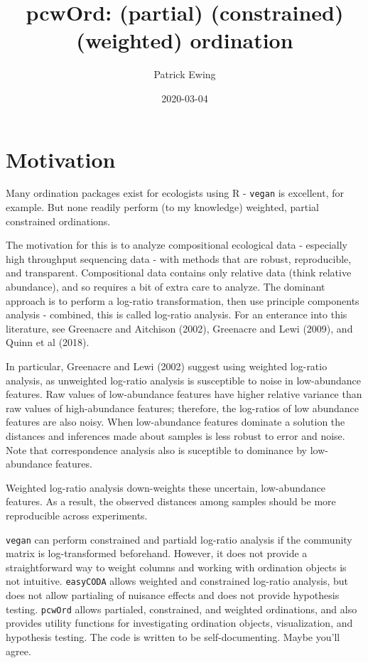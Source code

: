 \documentclass[
]{article}
\title{pcwOrd: (partial) (constrained) (weighted) ordination}
\author{Patrick Ewing}
\date{2020-03-04}
\begin{document}
\maketitle

\tableofcontents
\newpage

\hypertarget{motivation}{%
\section{Motivation}\label{motivation}}

Many ordination packages exist for ecologists using R - \texttt{vegan}
is excellent, for example. But none readily perform (to my knowledge)
weighted, partial constrained ordinations.

The motivation for this is to analyze compositional ecological data -
especially high throughput sequencing data - with methods that are
robust, reproducible, and transparent. Compositional data contains only
relative data (think relative abundance), and so requires a bit of extra
care to analyze. The dominant approach is to perform a log-ratio
transformation, then use principle components analysis - combined, this
is called log-ratio analysis. For an enterance into this literature, see
Greenacre and Aitchison (2002), Greenacre and Lewi (2009), and Quinn et
al (2018).

In particular, Greenacre and Lewi (2002) suggest using weighted
log-ratio analysis, as unweighted log-ratio analysis is susceptible to
noise in low-abundance features. Raw values of low-abundance features
have higher relative variance than raw values of high-abundance
features; therefore, the log-ratios of low abundance features are also
noisy. When low-abundance features dominate a solution the distances and
inferences made about samples is less robust to error and noise. Note
that correspondence analysis also is suceptible to dominance by
low-abundance features.

Weighted log-ratio analysis down-weights these uncertain, low-abundance
features. As a result, the observed distances among samples should be
more reproducible across experiments.

\texttt{vegan} can perform constrained and partiald log-ratio analysis
if the community matrix is log-transformed beforehand. However, it does
not provide a straightforward way to weight columns and working with
ordination objects is not intuitive. \texttt{easyCODA} allows weighted
and constrained log-ratio analysis, but does not allow partialing of
nuisance effects and does not provide hypothesis testing.
\texttt{pcwOrd} allows partialed, constrained, and weighted ordinations,
and also provides utility functions for investigating ordination
objects, visualization, and hypothesis testing. The code is written to
be self-documenting. Maybe you'll agree.
\end{document}
